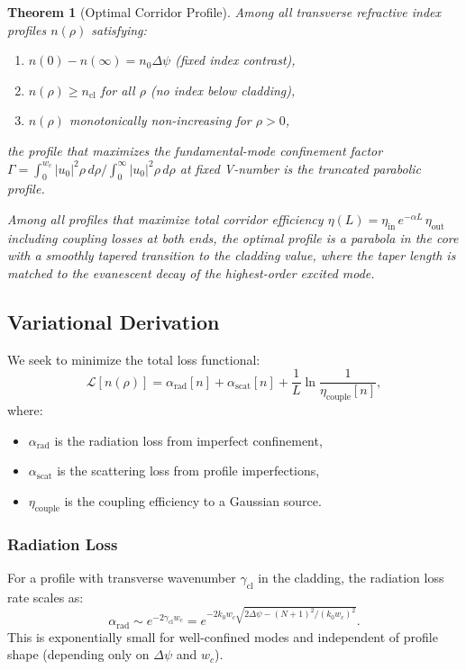 \documentclass[journal,twocolumn]{IEEEtran}
\newtheorem{theorem}{Theorem}
\begin{document}
\begin{theorem}[Optimal Corridor Profile]
Among all transverse refractive index profiles $n(\rho)$ satisfying:
\begin{enumerate}
\item[(i)] $n(0) - n(\infty) = n_0\Delta\psi$ (fixed index contrast),
\item[(ii)] $n(\rho) \geq n_\text{cl}$ for all $\rho$ (no index below cladding),
\item[(iii)] $n(\rho)$ monotonically non-increasing for $\rho > 0$,
\end{enumerate}
the profile that maximizes the fundamental-mode confinement factor
$\Gamma = \int_0^{w_c} |u_0|^2\rho\,d\rho / \int_0^\infty |u_0|^2\rho\,d\rho$
at fixed V-number is the truncated parabolic profile.

Among all profiles that maximize \emph{total corridor efficiency}
$\eta(L) = \eta_\text{in}\,e^{-\alpha L}\,\eta_\text{out}$
including coupling losses at both ends, the optimal profile is a
parabola in the core with a smoothly tapered transition to the cladding
value, where the taper length is matched to the evanescent decay of the
highest-order excited mode.
\end{theorem}

\subsection{Variational Derivation}

We seek to minimize the total loss functional:
\begin{equation}
\mathcal{L}[n(\rho)] = \alpha_\text{rad}[n] + \alpha_\text{scat}[n]
+ \frac{1}{L}\ln\frac{1}{\eta_\text{couple}[n]},
\label{eq:loss_functional}
\end{equation}
where:
\begin{itemize}
\item $\alpha_\text{rad}$ is the radiation loss from imperfect confinement,
\item $\alpha_\text{scat}$ is the scattering loss from profile imperfections,
\item $\eta_\text{couple}$ is the coupling efficiency to a Gaussian source.
\end{itemize}

\subsubsection{Radiation Loss}

For a profile with transverse wavenumber $\gamma_\text{cl}$ in the
cladding, the radiation loss rate scales as:
\begin{equation}
\alpha_\text{rad} \sim e^{-2\gamma_\text{cl} w_c}
= e^{-2k_0 w_c \sqrt{2\Delta\psi - (N+1)^2/(k_0 w_c)^2}}.
\end{equation}
This is exponentially small for well-confined modes and independent of
profile shape (depending only on $\Delta\psi$ and $w_c$).
\end{document}

